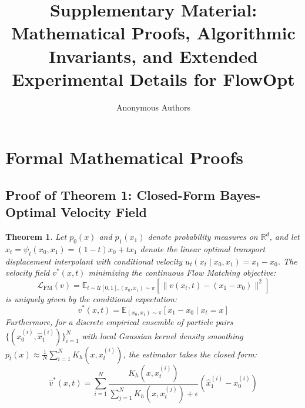 \documentclass[10pt,journal,compsoc]{IEEEtran}
\newtheorem{theorem}{Theorem}
\begin{document}
\title{Supplementary Material: Mathematical Proofs, Algorithmic Invariants, and Extended Experimental Details for FlowOpt}

\author{Anonymous Authors}

\maketitle

\appendices

\section{Formal Mathematical Proofs}

\subsection{Proof of Theorem 1: Closed-Form Bayes-Optimal Velocity Field}
\begin{theorem}
Let $p_0(x)$ and $p_1(x_1)$ denote probability measures on $\mathbb{R}^d$, and let $x_t = \psi_t(x_0, x_1) = (1 - t)x_0 + t x_1$ denote the linear optimal transport displacement interpolant with conditional velocity $u_t(x_t \mid x_0, x_1) = x_1 - x_0$. The velocity field $v^*(x, t)$ minimizing the continuous Flow Matching objective:
\begin{equation}
\mathcal{L}_{\text{FM}}(v) = \mathbb{E}_{t \sim \mathcal{U}[0, 1], (x_0, x_1) \sim \pi} \left[ \| v(x_t, t) - (x_1 - x_0) \|^2 \right]
\end{equation}
is uniquely given by the conditional expectation:
\begin{equation}
v^*(x, t) = \mathbb{E}_{(x_0, x_1) \sim \pi} \left[ x_1 - x_0 \mid x_t = x \right]
\end{equation}
Furthermore, for a discrete empirical ensemble of particle pairs $\{(x_0^{(i)}, \hat{x}_1^{(i)})\}_{i=1}^N$ with local Gaussian kernel density smoothing $p_t(x) \approx \frac{1}{N} \sum_{i=1}^N K_h(x, x_t^{(i)})$, the estimator takes the closed form:
\begin{equation}
\hat{v}^*(x, t) = \sum_{i=1}^N \frac{K_h(x, x_t^{(i)})}{\sum_{j=1}^N K_h(x, x_t^{(j)}) + \epsilon} \left( \hat{x}_1^{(i)} - x_0^{(i)} \right)
\end{equation}
\end{theorem}
\end{document}
